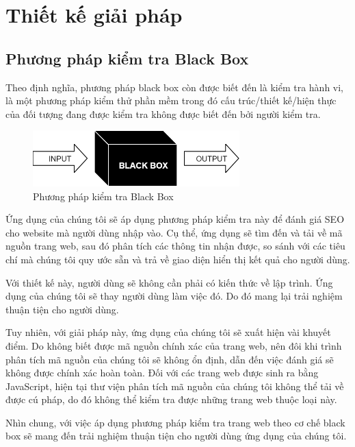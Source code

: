 \chapter{Thiết kế giải pháp}
\section{Phương pháp kiểm tra Black Box}
Theo định nghĩa\cite{blackbox}, phương pháp black box còn được biết đến là kiểm tra hành vi, là một phương pháp kiểm thử phần mềm trong đó cấu trúc/thiết kế/hiện thực của đối tượng đang được kiểm tra không được biết đến bởi người kiểm tra.
\begin{center}
	\begin{figure}[!ht]
		\centering
		\includegraphics[width=80mm]{images/black-box.png}
		\caption{Phương pháp kiểm tra Black Box}
	\end{figure}
\end{center}
\par
Ứng dụng của chúng tôi sẽ áp dụng phương pháp kiểm tra này để đánh giá SEO cho website mà người dùng nhập vào. Cụ thể, ứng dụng sẽ tìm đến và tải về mã nguồn trang web, sau đó phân tích các thông tin nhận được, so sánh với các tiêu chí mà chúng tôi quy ước sẵn và trả về giao diện hiển thị kết quả cho người dùng.
\par
Với thiết kế này, người dùng sẽ không cần phải có kiến thức về lập trình. Ứng dụng của chúng tôi sẽ thay người dùng làm việc đó. Do đó mang lại trải nghiệm thuận tiện cho người dùng.
\par
Tuy nhiên, với giải pháp này, ứng dụng của chúng tôi sẽ xuất hiện vài khuyết điểm. Do không biết được mã nguồn chính xác của trang web, nên đôi khi trình phân tích mã nguồn của chúng tôi sẽ không ổn định, dẫn đến việc đánh giá sẽ không được chính xác hoàn toàn. Đối với các trang web được sinh ra bằng JavaScript, hiện tại thư viện phân tích mã nguồn của chúng tôi không thể tải về được cú pháp, do đó không thể kiểm tra được những trang web thuộc loại này.
\par
Nhìn chung, với việc áp dụng phương pháp kiểm tra trang web theo cơ chế black box sẽ mang đến trải nghiệm thuận tiện cho người dùng ứng dụng của chúng tôi.
